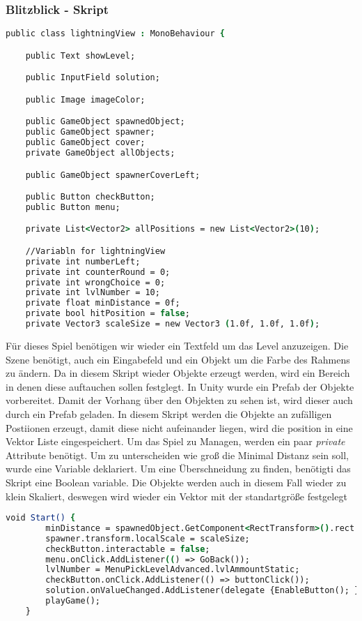 \subsubsection{Blitzblick - Skript}
\begin{lstlisting}[language=csh, caption={lightningView.cs Variablen Deklaration}]
public class lightningView : MonoBehaviour {

	public Text showLevel;

	public InputField solution;

	public Image imageColor;

	public GameObject spawnedObject;
	public GameObject spawner;
	public GameObject cover;
	private GameObject allObjects;

	public GameObject spawnerCoverLeft;

	public Button checkButton;
	public Button menu;

	private List<Vector2> allPositions = new List<Vector2>(10);

	//Variabln for lightningView
	private int numberLeft;
	private int counterRound = 0;
	private int wrongChoice = 0;
	private int lvlNumber = 10;
	private float minDistance = 0f;
	private bool hitPosition = false;
	private Vector3 scaleSize = new Vector3 (1.0f, 1.0f, 1.0f);
\end{lstlisting}
Für dieses Spiel benötigen wir wieder ein Textfeld um das Level anzuzeigen. Die Szene benötigt, auch ein Eingabefeld und ein Objekt um die Farbe des Rahmens zu ändern. Da in diesem Skript wieder Objekte erzeugt werden, wird ein Bereich in denen diese auftauchen sollen festglegt. In Unity wurde ein Prefab der Objekte vorbereitet. Damit der Vorhang über den Objekten zu sehen ist, wird dieser auch durch ein Prefab geladen. In diesem Skript werden die Objekte an zufälligen Postiionen erzeugt, damit diese nicht aufeinander liegen, wird die position in eine Vektor Liste eingespeichert. Um das Spiel zu Managen, werden ein paar \textit{private} Attribute benötigt. Um zu unterscheiden wie groß die Minimal Distanz sein soll, wurde eine Variable deklariert. Um eine Überschneidung zu finden, benötigti das Skript eine Boolean variable. Die Objekte werden auch in diesem Fall wieder zu klein Skaliert, deswegen wird wieder ein Vektor mit der standartgröße festgelegt\\
\begin{lstlisting}[language=csh, caption={lightningView.cs Start-Funktion}]
	void Start() {
		minDistance = spawnedObject.GetComponent<RectTransform>().rect.width / 2;
		spawner.transform.localScale = scaleSize;
		checkButton.interactable = false;
		menu.onClick.AddListener(() => GoBack());
		lvlNumber = MenuPickLevelAdvanced.lvlAmmountStatic;
		checkButton.onClick.AddListener(() => buttonClick());
		solution.onValueChanged.AddListener(delegate {EnableButton(); });
		playGame();
	}
\end{lstlisting}
